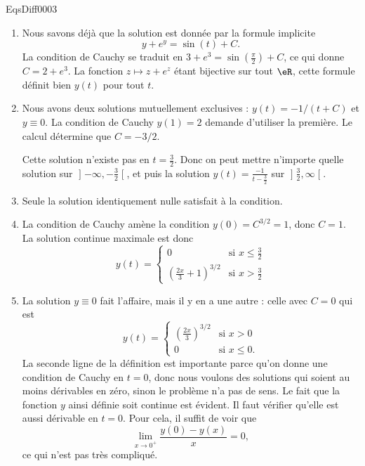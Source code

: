 \begin{corrige}{EqsDiff0003}
\begin{enumerate}
\item
Nous savons déjà que la solution est donnée par la formule implicite
\begin{equation}
	y+e^y=\sin(t)+C.
\end{equation}
La condition de Cauchy se traduit en $3+ e^{3}=\sin(\frac{ \pi }{ 2 })+C$, ce qui donne $C=2+ e^{3}$. La fonction $z\mapsto z+e^z$ étant bijective sur tout $\eR$, cette formule définit bien $y(t)$ pour tout $t$.

\item
Nous avons deux solutions mutuellement exclusives : $y(t)=-1/(t+C)$ et $y\equiv 0$. La condition de Cauchy $y(1)=2$ demande d'utiliser la première. Le calcul détermine que $C=-3/2$.

Cette solution n'existe pas en $t=\frac{ 3 }{ 2 }$. Donc on peut mettre n'importe quelle solution sur $\mathopen]-\infty,-\frac{ 3 }{ 2 }\mathclose[$, et puis la solution $y(t)=\frac{ -1 }{ t-\frac{ 3 }{ 2 } }$ sur $\mathopen]\frac{ 3 }{ 2 },\infty\mathclose[$.

\item
Seule la solution identiquement nulle satisfait à la condition.

\item
La condition de Cauchy amène la condition $y(0)=C^{3/2}=1$, donc $C=1$. La solution continue maximale est donc
\begin{equation}
	y(t)=\begin{cases}
	0	&	\text{si $x\leq\frac{ 3 }{ 2 }$}\\
	\left( \frac{ 2x }{ 3 }+1 \right)^{3/2}	&	 \text{si $x>\frac{ 3 }{ 2 }$}
\end{cases}
\end{equation}

\item
La solution $y\equiv 0$ fait l'affaire, mais il y en a une autre : celle avec $C=0$ qui est
\begin{equation}
	y(t)=\begin{cases}
	\left( \frac{ 2x }{ 3 } \right)^{3/2}	&	\text{si $x>0$}\\
	0	&	 \text{si $x\leq 0$.}
\end{cases}
\end{equation}
La seconde ligne de la définition est importante parce qu'on donne une condition de Cauchy en $t=0$, donc nous voulons des solutions qui soient au moins dérivables en zéro, sinon le problème n'a pas de sens. Le fait que la fonction $y$ ainsi définie soit continue est évident. Il faut vérifier qu'elle est aussi dérivable en $t=0$. Pour cela, il suffit de voir que
\begin{equation}
	\lim_{x\to 0^+} \frac{ y(0)-y(x) }{ x }=0,
\end{equation}
ce qui n'est pas très compliqué.


\end{enumerate}
\end{corrige}
